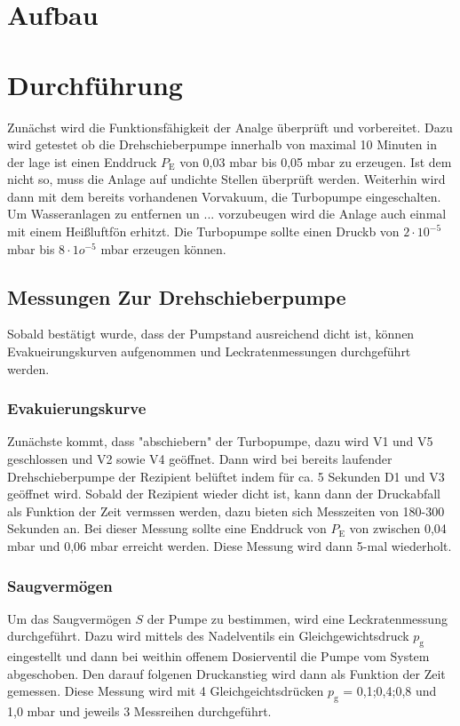 \section{Aufbau}

\section{Durchführung}
	Zunächst wird die Funktionsfähigkeit der Analge überprüft und vorbereitet. 
	Dazu wird getestet ob die Drehschieberpumpe innerhalb von maximal 10 Minuten in der lage ist einen Enddruck $P_\text{E}$ von 0,03 mbar bis 0,05 mbar zu erzeugen. 
	Ist dem nicht so, muss die Anlage auf undichte Stellen überprüft werden.
	Weiterhin wird dann mit dem bereits vorhandenen Vorvakuum, die Turbopumpe eingeschalten. 
	Um Wasseranlagen zu entfernen un ... vorzubeugen wird die Anlage auch einmal mit einem Heißluftfön erhitzt.
	Die Turbopumpe sollte einen Druckb von $2 \cdot 10^{-5}$ mbar bis $8 \cdot 1o^{-5}$ mbar erzeugen können.

	\subsection{Messungen Zur Drehschieberpumpe}
		Sobald bestätigt wurde, dass der Pumpstand ausreichend dicht ist, können Evakueirungskurven aufgenommen und Leckratenmessungen durchgeführt werden.

		\subsubsection{Evakuierungskurve}

			Zunächste kommt, dass "abschiebern" der Turbopumpe, dazu wird V1 und V5 geschlossen und V2 sowie V4 geöffnet.
			Dann wird bei bereits laufender Drehschieberpumpe der Rezipient belüftet indem für ca. 5 Sekunden D1 und V3 geöffnet wird. 
			Sobald der Rezipient wieder dicht ist, kann dann der Druckabfall als Funktion der Zeit vermssen werden, dazu bieten sich Messzeiten von 180-300 Sekunden an.
			Bei dieser Messung sollte eine Enddruck von $P_\text{E}$ von zwischen 0,04 mbar und 0,06 mbar erreicht werden.
			Diese Messung wird dann 5-mal wiederholt.

		\subsubsection{Saugvermögen}

			Um das Saugvermögen $S$ der Pumpe zu bestimmen, wird eine Leckratenmessung durchgeführt. 
			Dazu wird mittels des Nadelventils ein Gleichgewichtsdruck $p_\text{g}$ eingestellt und dann bei weithin offenem Dosierventil die Pumpe vom System abgeschoben. 
			Den darauf folgenen Druckanstieg wird dann als Funktion der Zeit gemessen. 
			Diese Messung wird mit 4 Gleichgeichtsdrücken $p_\text{g}$ = 0,1;0,4;0,8 und 1,0 mbar und jeweils 3 Messreihen durchgeführt.


  
